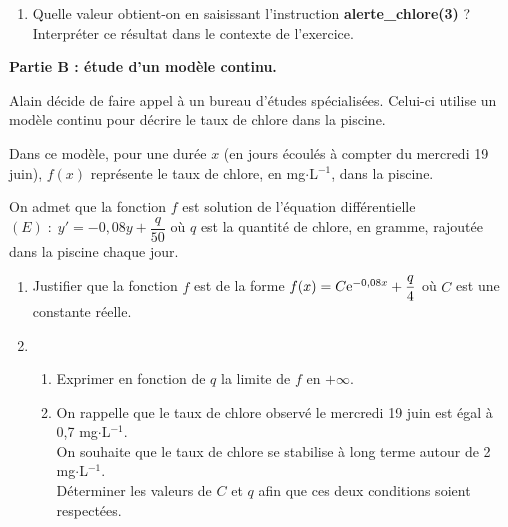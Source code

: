 \documentclass[11pt,fleqn, openany]{book} %
\begin{document}
\begin{exercise}[topic=diff03, subtitle={(Métropole 2024)}]
\begin{enumerate}



\item Quelle valeur obtient-on en saisissant l'instruction \textbf{alerte\_chlore(3)} ? Interpréter ce résultat dans le contexte de l'exercice.
\end{enumerate}

\textbf{Partie B : étude d'un modèle continu.}

Alain décide de faire appel à un bureau d'études spécialisées. Celui-ci utilise un modèle continu pour décrire le taux de chlore dans la piscine.

Dans ce modèle, pour une durée $x$ (en jours écoulés à compter du mercredi 19 juin), $f(x)$ représente le taux de chlore, en mg$\cdot$L$^{-1}$, dans la piscine.

On admet que la fonction $f$ est solution de l'équation différentielle $(E) \;:\; y' = -0,08y+\dfrac{q}{50}$ où $q$ est la quantité de chlore, en gramme, rajoutée dans la piscine chaque jour.

\begin{enumerate}
\item Justifier que la fonction $f$ est de la forme $f(x) = C\mathrm{e}^{-0,08x}+\dfrac{q}{4}$ où $C$ est une constante réelle.
\item \begin{enumerate}
\item Exprimer en fonction de $q$ la limite de $f$ en $+\infty$.
\item On rappelle que le taux de chlore observé le mercredi 19 juin est égal à 0,7 mg$\cdot$L$^{-1}$.\\
On souhaite que le taux de chlore se stabilise à long terme autour de 2 mg$\cdot$L$^{-1}$.\\
Déterminer les valeurs de $C$ et $q$ afin que ces deux conditions soient respectées.
\end{enumerate} 

\end{enumerate}
\newpage
\end{exercise}
\end{document}
